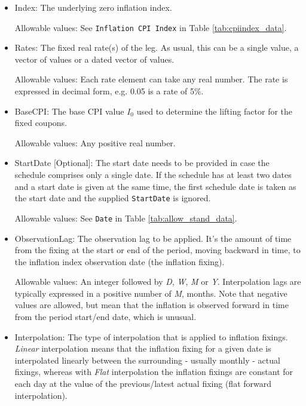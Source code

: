 \begin{itemize}
\item Index: The underlying zero inflation index.

Allowable values:  See \lstinline!Inflation CPI Index! in Table \ref{tab:cpiindex_data}.
\item Rates: The fixed real rate(s) of the leg. As usual, this can be a single value, a vector of values or a dated vector of
  values.
 
 Allowable values: Each rate element can take any  real number. The rate is
  expressed in decimal form, e.g. 0.05 is a rate of 5\%.
\item BaseCPI: The base CPI value $I_0$ used to determine the lifting factor for the fixed coupons.

Allowable values:  Any positive real number.

\item StartDate [Optional]: The start date needs to be provided in case the schedule comprises only a single date. If
  the schedule has at least two dates and a start date is given at the same time, the first schedule date is taken as 
  the start date and the supplied \lstinline!StartDate! is ignored.
  
Allowable values:  See \lstinline!Date! in Table \ref{tab:allow_stand_data}. 

\item ObservationLag: The observation lag to be applied. It's the amount of time from the fixing at the start or end of the period, moving backward in time, to the inflation index observation date (the inflation fixing). 

Allowable values: An integer followed by \emph{D}, \emph{W}, \emph{M} or \emph{Y}. Interpolation lags are typically expressed in a positive number of  \emph{M}, months. Note that negative values are allowed, but mean that the inflation is observed forward in time from the period start/end date, which is unusual.  

\item Interpolation: The type of interpolation that is applied to inflation fixings. \emph{Linear} interpolation means that the inflation fixing for a given date is interpolated linearly between the surrounding - usually monthly - actual fixings, whereas with  \emph{Flat} interpolation the inflation fixings are constant for each day at the value of the previous/latest actual fixing (flat forward interpolation).  


\end{itemize}
